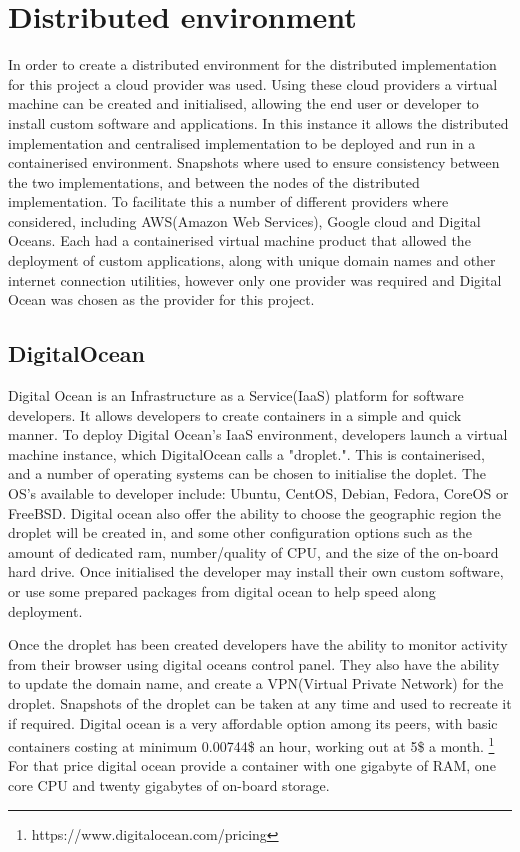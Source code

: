\documentclass[oneside,12pt]{book}
\begin{document}
\section{Distributed environment}
In order to create a distributed environment for the distributed implementation for this project a cloud provider was used. Using these cloud providers a virtual machine can be created and initialised, allowing the end user or developer to install custom software and applications. In this instance it allows the distributed implementation and centralised implementation to be deployed and run in a containerised environment. Snapshots where used to ensure consistency between the two implementations, and between the nodes of the distributed implementation. To facilitate this a number of different providers where considered, including AWS(Amazon Web Services), Google cloud and Digital Oceans. Each had a containerised virtual machine product that allowed the deployment of custom applications, along with unique domain names and other internet connection utilities, however only one provider was required and Digital Ocean was chosen as the provider for this project. 

\subsection{DigitalOcean}
Digital Ocean is an Infrastructure as a Service(IaaS) platform for software developers. It allows developers to create containers in a simple and quick manner. To deploy Digital Ocean's IaaS environment, developers launch a virtual machine instance, which DigitalOcean calls a "droplet.". This is containerised, and a number of operating systems can be chosen to initialise the doplet. The OS's available to developer include: Ubuntu, CentOS, Debian, Fedora, CoreOS or FreeBSD. Digital ocean also offer the ability to choose the geographic region the droplet will be created in, and some other configuration options such as the amount of dedicated ram, number/quality of CPU, and the size of the on-board hard drive. Once initialised the developer may install their own custom software, or use some prepared packages from digital ocean to help speed along deployment. 

Once the droplet has been created developers have the ability to monitor activity from their browser using digital oceans control panel. They also have the ability to update the domain name, and create a VPN(Virtual Private Network) for the droplet. Snapshots of the droplet can be taken at any time and used to recreate it if required. Digital ocean is a very affordable option among its peers, with basic containers costing at minimum 0.00744\$ an hour, working out at 5\$ a month. \footnote{https://www.digitalocean.com/pricing} For that price digital ocean provide a container with one gigabyte of RAM, one core CPU and twenty gigabytes of on-board storage.
\end{document}
